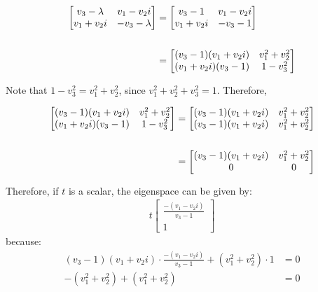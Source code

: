 \begin{align}
    \left[ \begin{matrix}
        v_3 - \lambda & v_1 - v_2i \\ v_1 + v_2i & -v_3 - \lambda
        \end{matrix} \right]
        &=
        \left[ \begin{matrix}
            v_3 - 1 & v_1 - v_2i \\ v_1 + v_2i & -v_3 - 1
        \end{matrix} \right] \\ \notag \\
    &= \left[ \begin{matrix}
            (v_3 - 1)(v_1 + v_2i) & v_1^2 + v_2^2 \\
            (v_1 + v_2i)(v_3 - 1) & 1 -v_3^2
        \end{matrix} \right]
\end{align}

Note that $1 - v_3^2 = v_1^2 + v_2^2$,
since $v_1^2 + v_2^2 + v_3^2 = 1$. Therefore,

\begin{align}
    \left[ \begin{matrix}
            (v_3 - 1)(v_1 + v_2i) & v_1^2 + v_2^2 \\
            (v_1 + v_2i)(v_3 - 1) & 1 -v_3^2
        \end{matrix} \right]
        &=
        \left[ \begin{matrix}
            (v_3 - 1)(v_1 + v_2i) & v_1^2 + v_2^2 \\
            (v_3 - 1)(v_1 + v_2i) & v_1^2 + v_2^2
        \end{matrix} \right] \\ \notag \\
    &= \left[ \begin{matrix}
            (v_3 - 1)(v_1 + v_2i) & v_1^2 + v_2^2 \\
            0 & 0
        \end{matrix} \right]
\end{align}

Therefore, if $t$ is a scalar,
the eigenspace can be given by:
\begin{align}
    t \left[ \begin{matrix}
        \frac{-(v_1 - v_2i)}{v_3 - 1} \\ 1
    \end{matrix} \right]
\end{align}
because:
\begin{align}
    (v_3 - 1)(v_1 + v_2i) \cdot
    \frac{-(v_1 - v_2i)}{v_3 - 1} +
    (v_1^2 + v_2^2) \cdot 1 &= 0 \\
    -(v_1^2 + v_2^2) + (v_1^2 + v_2^2) &= 0
\end{align}

